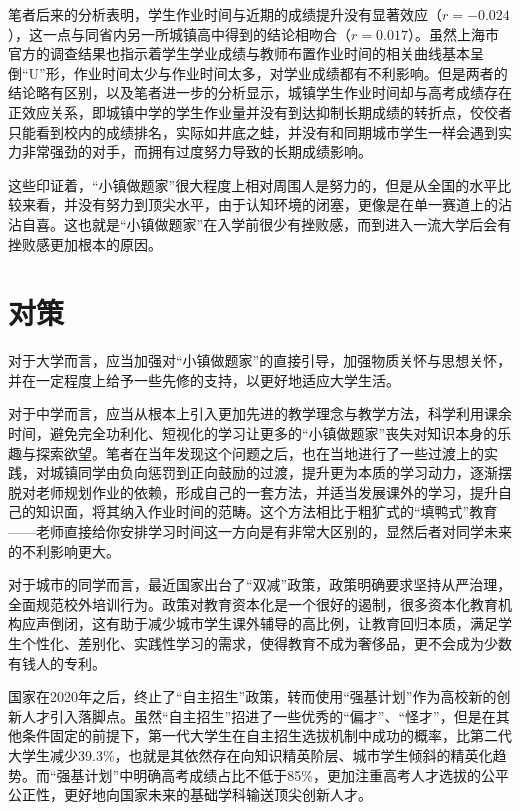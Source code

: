 \documentclass[10pt,a4paper,heading=false]{ctexart}
\begin{document}
    笔者后来的分析表明，学生作业时间与近期的成绩提升没有显著效应（$r=-0.024$）\cite{planstormrelation}，这一点与同省内另一所城镇高中得到的结论相吻合（$r=0.017$）\cite{phyquantity}。虽然上海市官方的调查结果也指示着学生学业成绩与教师布置作业时间的相关曲线基本呈倒“U”形，作业时间太少与作业时间太多，对学业成绩都有不利影响\cite{shanghaihome}。但是两者的结论略有区别，以及笔者进一步的分析显示，城镇学生作业时间却与高考成绩存在正效应关系\cite{planstormrelation}，即城镇中学的学生作业量并没有到达抑制长期成绩的转折点，佼佼者只能看到校内的成绩排名，实际如井底之蛙，并没有和同期城市学生一样会遇到实力非常强劲的对手，而拥有过度努力导致的长期成绩影响。

    这些印证着，“小镇做题家”很大程度上相对周围人是努力的，但是从全国的水平比较来看，并没有努力到顶尖水平，由于认知环境的闭塞，更像是在单一赛道上的沾沾自喜。这也就是“小镇做题家”在入学前很少有挫败感，而到进入一流大学后会有挫败感更加根本的原因。
    \section{对策}

    对于大学而言，应当加强对“小镇做题家”的直接引导，加强物质关怀与思想关怀，并在一定程度上给予一些先修的支持，以更好地适应大学生活。
    
    对于中学而言，应当从根本上引入更加先进的教学理念与教学方法，科学利用课余时间，避免完全功利化、短视化的学习让更多的“小镇做题家”丧失对知识本身的乐趣与探索欲望。笔者在当年发现这个问题之后，也在当地进行了一些过渡上的实践\cite{planstormtech}，对城镇同学由负向惩罚到正向鼓励的过渡，提升更为本质的学习动力，逐渐摆脱对老师规划作业的依赖，形成自己的一套方法，并适当发展课外的学习，提升自己的知识面，将其纳入作业时间的范畴。这个方法相比于粗犷式的“填鸭式”教育------老师直接给你安排学习时间这一方向是有非常大区别的，显然后者对同学未来的不利影响更大。

    对于城市的同学而言，最近国家出台了“双减”政策\cite{doublereduction}，政策明确要求坚持从严治理，全面规范校外培训行为。政策对教育资本化是一个很好的遏制，很多资本化教育机构应声倒闭，这有助于减少城市学生课外辅导的高比例，让教育回归本质，满足学生个性化、差别化、实践性学习的需求，使得教育不成为奢侈品，更不会成为少数有钱人的专利\cite{revolution}。

    国家在2020年之后，终止了“自主招生”政策，转而使用“强基计划”作为高校新的创新人才引入落脚点。虽然“自主招生”招进了一些优秀的“偏才”、“怪才”，但是在其他条件固定的前提下，第一代大学生在自主招生选拔机制中成功的概率，比第二代大学生减少39.3\%，也就是其依然存在向知识精英阶层、城市学生倾斜的精英化趋势\cite{fair}。而“强基计划”中明确高考成绩占比不低于85\%，更加注重高考人才选拔的公平公正性，更好地向国家未来的基础学科输送顶尖创新人才\cite{newrev}。
\end{document}
